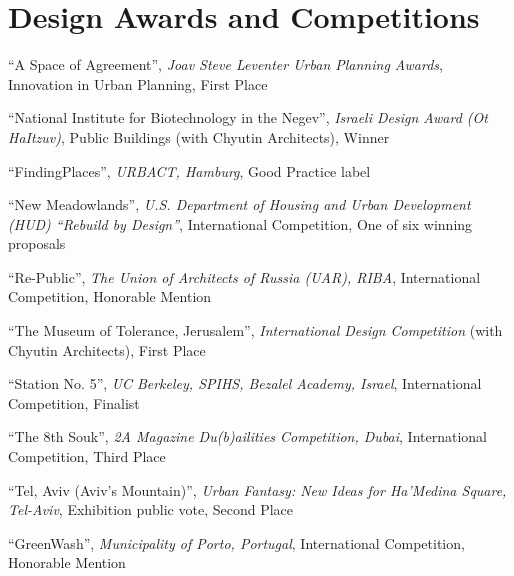 \section*{Design Awards and Competitions}

\begin{tablist}

    \item[2026]\tab \enquote{A Space of Agreement},
    \textit{Joav Steve Leventer Urban Planning Awards},
    Innovation in Urban Planning, First Place

    \item[2018]\tab \enquote{National Institute for Biotechnology in the Negev},
    \textit{Israeli Design Award (Ot HaItzuv)},
    Public Buildings (with Chyutin Architects), Winner

    \item[2017]\tab \enquote{FindingPlaces},
    \textit{URBACT, Hamburg},
    Good Practice label

    \item[2014]\tab \enquote{New Meadowlands},
    \textit{U.S. Department of Housing and Urban Development (HUD) ``Rebuild by Design''},
    International Competition,
    One of six winning proposals

    \item[2011]\tab \enquote{Re-Public},
    \textit{The Union of Architects of Russia (UAR), RIBA},
    International Competition,
    Honorable Mention

    \item[2010]\tab \enquote{The Museum of Tolerance, Jerusalem},
    \textit{International Design Competition} (with Chyutin Architects),
    First Place

    \item[2010]\tab \enquote{Station No. 5},
    \textit{UC Berkeley, SPIHS, Bezalel Academy, Israel},
    International Competition,
    Finalist

    \item[2009]\tab \enquote{The 8th Souk},
    \textit{2A Magazine Du(b)ailities Competition, Dubai},
    International Competition,
    Third Place

    \item[2009]\tab \enquote{Tel, Aviv (Aviv's Mountain)},
    \textit{Urban Fantasy: New Ideas for Ha'Medina Square, Tel-Aviv},
    Exhibition public vote,
    Second Place

    \item[2008]\tab \enquote{GreenWash},
    \textit{Municipality of Porto, Portugal},
    International Competition,
    Honorable Mention


\end{tablist}
